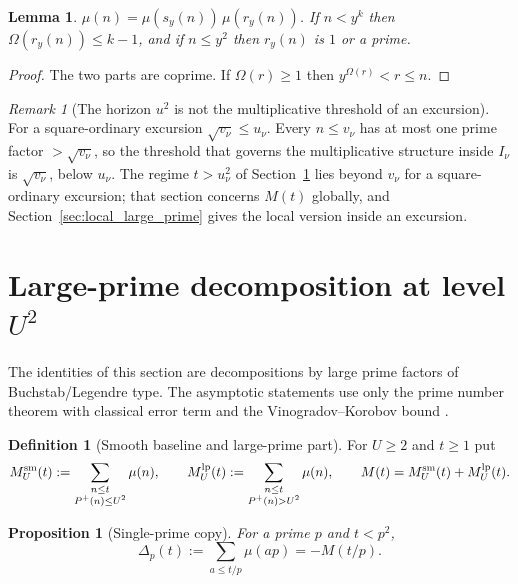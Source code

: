 \documentclass[11pt]{amsart}
\numberwithin{equation}{section}
\theoremstyle{plain}
\newtheorem{proposition}[theorem]{Proposition}
\newtheorem{lemma}[theorem]{Lemma}
\theoremstyle{definition}
\newtheorem{definition}[theorem]{Definition}
\theoremstyle{remark}
\newtheorem{remark}[theorem]{Remark}
\newcommand{\Pp}{P^{+}}
\begin{document}
\begin{lemma}
\label{lem:rough_part}
$\mu(n)=\mu(s_y(n))\,\mu(r_y(n))$. If $n<y^k$ then $\Omega(r_y(n))\le k-1$,
and if $n\le y^2$ then $r_y(n)$ is $1$ or a prime.
\end{lemma}

\begin{proof}
The two parts are coprime. If $\Omega(r)\ge1$ then $y^{\Omega(r)}<r\le n$.
\end{proof}

\begin{remark}[The horizon $u^2$ is not the multiplicative threshold of an excursion]
\label{rem:horizon_inactive}
For a square-ordinary excursion $\sqrt{v_\nu}\le u_\nu$. Every $n\le v_\nu$
has at most one prime factor $>\sqrt{v_\nu}$, so the threshold that governs
the multiplicative structure inside $I_\nu$ is $\sqrt{v_\nu}$, below
$u_\nu$. The regime $t>u_\nu^2$ of Section~\ref{sec:prime_copy_propagation}
lies beyond $v_\nu$ for a square-ordinary excursion; that section concerns
$M(t)$ globally, and Section~\ref{sec:local_large_prime} gives the local
version inside an excursion.
\end{remark}

\section{Large-prime decomposition at level \texorpdfstring{$U^2$}{U^2}}
\label{sec:prime_copy_propagation}

The identities of this section are decompositions by large prime factors of
Buchstab/Legendre type. The asymptotic statements use only the prime number
theorem with classical error term and the Vinogradov--Korobov bound
\cite{MontgomeryVaughan2007,Walfisz1963}.

\begin{definition}[Smooth baseline and large-prime part]
\label{def:baseline_channel}
For $U\ge2$ and $t\ge1$ put
\begin{equation}
\label{eq:baseline_channel_def}
  M^{\rm sm}_U(t):=\sum_{\substack{n\le t\\ \Pp(n)\le U^2}}\mu(n),\qquad
  M^{\rm lp}_U(t):=\sum_{\substack{n\le t\\ \Pp(n)>U^2}}\mu(n),\qquad
  M(t)=M^{\rm sm}_U(t)+M^{\rm lp}_U(t).
\end{equation}
\end{definition}

\begin{proposition}[Single-prime copy]
\label{prop:single_prime_copy}
For a prime $p$ and $t<p^2$,
\begin{equation}
\label{eq:single-prime-copy}
  \Delta_p(t):=\sum_{a\le t/p}\mu(ap)=-M(t/p).
\end{equation}
\end{proposition}
\end{document}
